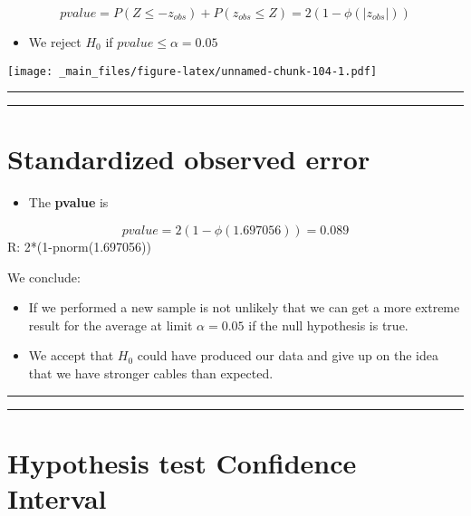 \documentclass[
]{book}
\providecommand{\tightlist}{%
  \setlength{\itemsep}{0pt}\setlength{\parskip}{0pt}}
\begin{document}
\[pvalue = P(Z \leq -z_{obs}) + P(z_{obs} \leq Z) = 2 (1-\phi(|z_{obs}|))\]

\begin{itemize}
\tightlist
\item
  We reject \(H_0\) if \(pvalue \leq \alpha =0.05\)
\end{itemize}

\texttt{[image: \_main\_files/figure-latex/unnamed-chunk-104-1.pdf]}

\begin{center}\rule{0.5\linewidth}{0.5pt}\end{center}

\begin{center}\rule{0.5\linewidth}{0.5pt}\end{center}

\hypertarget{standardized-observed-error-1}{%
\section{Standardized observed error}\label{standardized-observed-error-1}}

\begin{itemize}
\tightlist
\item
  The \textbf{pvalue} is
\end{itemize}

\[pvalue=2 (1-\phi(1.697056))=0.089\]
R: 2*(1-pnorm(1.697056))

We conclude:

\begin{itemize}
\item
  If we performed a new sample is not unlikely that we can get a more extreme result for the average at limit \(\alpha=0.05\) if the null hypothesis is true.
\item
  We accept that \(H_0\) could have produced our data and give up on the idea that we have stronger cables than expected.
\end{itemize}

\begin{center}\rule{0.5\linewidth}{0.5pt}\end{center}

\begin{center}\rule{0.5\linewidth}{0.5pt}\end{center}

\hypertarget{hypothesis-test-confidence-interval}{%
\section{Hypothesis test Confidence Interval}\label{hypothesis-test-confidence-interval}}
\end{document}
